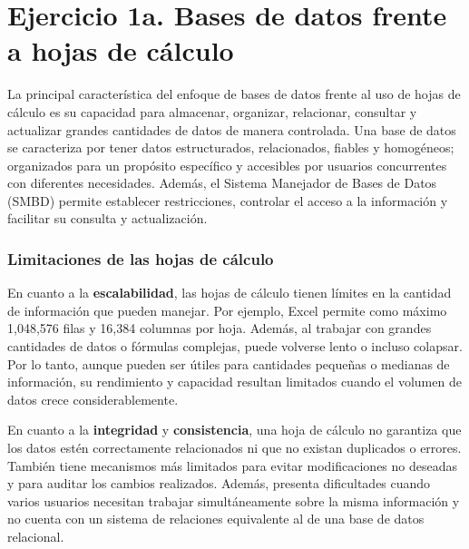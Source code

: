
\section*{Ejercicio 1a. Bases de datos frente a hojas de cálculo}

\noindent

\vspace{0.3cm}

La principal característica del enfoque de bases de datos frente al uso de hojas de cálculo es su capacidad para almacenar, organizar, relacionar, consultar y actualizar grandes cantidades de datos de manera controlada. Una base de datos se caracteriza por tener datos estructurados, relacionados, fiables y homogéneos; organizados para un propósito específico y accesibles por usuarios concurrentes con diferentes necesidades. Además, el Sistema Manejador de Bases de Datos (SMBD) permite establecer restricciones, controlar el acceso a la información y facilitar su consulta y actualización.

\vspace{0.3cm}

\subsubsection*{\textcolor{unamblue}{Limitaciones de las hojas de cálculo}}

En cuanto a la \textbf{escalabilidad}, las hojas de cálculo tienen límites en la cantidad de información que pueden manejar. Por ejemplo, Excel permite como máximo 1,048,576 filas y 16,384 columnas por hoja. Además, al trabajar con grandes cantidades de datos o fórmulas complejas, puede volverse lento o incluso colapsar. Por lo tanto, aunque pueden ser útiles para cantidades pequeñas o medianas de información, su rendimiento y capacidad resultan limitados cuando el volumen de datos crece considerablemente.

\vspace{0.2cm}

En cuanto a la \textbf{integridad} y \textbf{consistencia}, una hoja de cálculo no garantiza que los datos estén correctamente relacionados ni que no existan duplicados o errores. También tiene mecanismos más limitados para evitar modificaciones no deseadas y para auditar los cambios realizados. Además, presenta dificultades cuando varios usuarios necesitan trabajar simultáneamente sobre la misma información y no cuenta con un sistema de relaciones equivalente al de una base de datos relacional.

